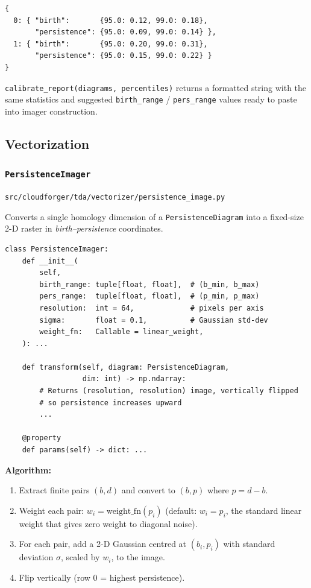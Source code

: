 \documentclass[11pt, a4paper]{article}
\newcommand{\code}[1]{\texttt{#1}}
\newcommand{\pyfile}[1]{\texttt{\small #1}}
\newcommand{\typename}[1]{\textbf{\texttt{#1}}}
\begin{document}
\begin{lstlisting}
{
  0: { "birth":       {95.0: 0.12, 99.0: 0.18},
       "persistence": {95.0: 0.09, 99.0: 0.14} },
  1: { "birth":       {95.0: 0.20, 99.0: 0.31},
       "persistence": {95.0: 0.15, 99.0: 0.22} }
}
\end{lstlisting}

\code{calibrate\_report(diagrams, percentiles)} returns a formatted
string with the same statistics and suggested \code{birth\_range} /
\code{pers\_range} values ready to paste into imager construction.

\subsection{Vectorization}

\subsubsection{\typename{PersistenceImager}}
\pyfile{src/cloudforger/tda/vectorizer/persistence\_image.py}

Converts a single homology dimension of a \code{PersistenceDiagram}
into a fixed-size 2-D raster in \emph{birth--persistence} coordinates.

\begin{lstlisting}
class PersistenceImager:
    def __init__(
        self,
        birth_range: tuple[float, float],  # (b_min, b_max)
        pers_range:  tuple[float, float],  # (p_min, p_max)
        resolution:  int = 64,             # pixels per axis
        sigma:       float = 0.1,          # Gaussian std-dev
        weight_fn:   Callable = linear_weight,
    ): ...

    def transform(self, diagram: PersistenceDiagram,
                  dim: int) -> np.ndarray:
        # Returns (resolution, resolution) image, vertically flipped
        # so persistence increases upward
        ...

    @property
    def params(self) -> dict: ...
\end{lstlisting}

\textbf{Algorithm:}
\begin{enumerate}
  \item Extract finite pairs $(b, d)$ and convert to
        $(b, p)$ where $p = d - b$.
  \item Weight each pair: $w_i = \mathrm{weight\_fn}(p_i)$
        (default: $w_i = p_i$, the standard linear weight that
        gives zero weight to diagonal noise).
  \item For each pair, add a 2-D Gaussian centred at $(b_i, p_i)$
        with standard deviation $\sigma$, scaled by $w_i$, to the image.
  \item Flip vertically (row 0 = highest persistence).
\end{enumerate}
\end{document}

